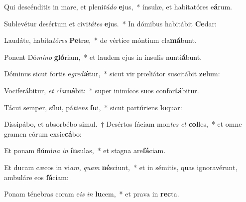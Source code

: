 \item Qui descénditis in mare, et pleni\textit{tú}\textit{do} \textbf{e}jus,~* ínsulæ, et habitatóres e\textbf{á}rum.
\item Sublevétur desértum et civi\textit{tá}\textit{tes} \textbf{e}jus.~* In dómibus habitábit \textbf{Ce}dar:
\item Laudáte, habita\textit{tó}\textit{res} \textbf{Pe}træ,~* de vértice móntium cla\textbf{má}bunt.
\item Ponent Dó\textit{mi}\textit{no} \textbf{gló}riam,~* et laudem ejus in ínsulis nunti\textbf{á}bunt.
\item Dóminus sicut fortis e\textit{gre}\textit{di}\textbf{é}tur,~* sicut vir prœliátor suscitábit \textbf{ze}lum:
\item Vociferábitur, \textit{et} \textit{cla}\textbf{má}bit:~* super inimícos suos confor\textbf{tá}bitur.
\item Tácui semper, sílui, pá\textit{ti}\textit{ens} \textbf{fu}i,~* sicut partúriens \textbf{lo}quar:
\item Dissipábo, et absorbébo simul.~† Desértos fáciam mon\textit{tes} \textit{et} \textbf{col}les,~* et omne gramen eórum exsic\textbf{cá}bo:
\item Et ponam flúmi\textit{na} \textit{in} \textbf{ín}sulas,~* et stagna are\textbf{fá}ciam.
\item Et ducam cæcos in vi\textit{am}, \textit{quam} \textbf{né}sciunt,~* et in sémitis, quas ignoravérunt, ambuláre eos \textbf{fá}ciam:
\item Ponam ténebras coram e\textit{is} \textit{in} \textbf{lu}cem,~* et prava in \textbf{rec}ta.
